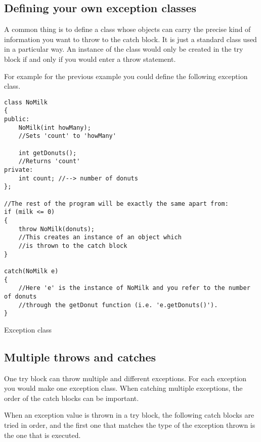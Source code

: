 \subsection{Defining your own exception classes}
A common thing is to define a class whose objects can carry the precise kind of information
you want to throw to the catch block. It is just a standard class used in a particular way. An
instance of the class would only be created in the try block if and only if you would enter a
throw statement.

For example for the previous example you could define the following exception class.

\begin{listing}[H]
\begin{verbatim}
class NoMilk
{
public:
	NoMilk(int howMany);
	//Sets 'count' to 'howMany'
	
	int getDonuts();
	//Returns 'count'
private:
	int count; //--> number of donuts
};

//The rest of the program will be exactly the same apart from:
if (milk <= 0)
{
	throw NoMilk(donuts);
	//This creates an instance of an object which
	//is thrown to the catch block
}

catch(NoMilk e)
{
	//Here 'e' is the instance of NoMilk and you refer to the number of donuts
	//through the getDonut function (i.e. 'e.getDonuts()').
}
\end{verbatim}
\caption{Exception class}
\label{source_code_1}
\end{listing}





\subsection{Multiple throws and catches}
One try block can throw multiple and different exceptions. For each exception you would
make one exception class. When catching multiple exceptions, the order of the catch blocks
can be important.

When an exception value is thrown in a try block, the following catch blocks are tried in order,
and the first one that matches the type of the exception thrown is the one that is executed.

